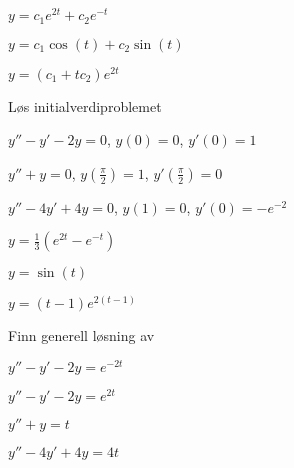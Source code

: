 \begin{losning}
	\begin{punkt}
		$y=c_1 e^{2t}+c_2 e^{-t}$
	\end{punkt}
	
	\begin{punkt}
		$y=c_1\cos(t)+ c_2 \sin (t)$
	\end{punkt}
	
	\begin{punkt}
		$y=(c_1+tc_2)e^{2t}$
	\end{punkt}
	
\end{losning}


\begin{oppgave}
Løs initialverdiproblemet
	\begin{punkt}
		$y''-y'-2y=0$, $y(0)=0$, $y'(0)=1$
	\end{punkt}
	
	\begin{punkt}
		$y''+y=0$, $y(\frac{\pi}{2})=1$, $y'(\frac{\pi}{2})=0$
	\end{punkt}
	
	\begin{punkt}
		$y''-4y'+4y=0$, $y(1)=0$, $y'(0)=-e^{-2}$
	\end{punkt}
	
\end{oppgave}

\begin{losning}
	\begin{punkt}
		$y=\frac{1}{3}( e^{2t}- e^{-t})$
	\end{punkt}
	
	\begin{punkt}
		$y= \sin (t)$
	\end{punkt}
	
	\begin{punkt}
		$y=(t-1)e^{2(t-1)}$
	\end{punkt}
	
\end{losning}


\begin{oppgave}
	Finn generell løsning av
	\begin{punkt}
		$y''-y'-2y=e^{-2t}$
	\end{punkt}

	\begin{punkt}
		$y''-y'-2y=e^{2t}$
	\end{punkt}
	
	\begin{punkt}
		$y''+y=t$
	\end{punkt}
	
	\begin{punkt}
		$y''-4y'+4y=4t$
	\end{punkt}
	
\end{oppgave}


